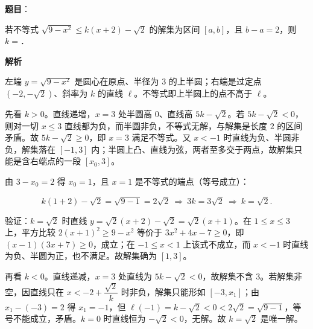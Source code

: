 \begin{answer}

\textbf{题目}：

若不等式 $\sqrt{9-x^2}\leqslant k(x+2)-\sqrt2$ 的解集为区间 $[a,b]$，且 $b-a=2$，则 $k=$\gkblank{}．

\textbf{解析}

左端 $y=\sqrt{9-x^2}$ 是圆心在原点、半径为 $3$ 的上半圆；右端是过定点 $(-2,-\sqrt2)$、斜率为 $k$ 的直线 $\ell$。不等式即上半圆上的点不高于 $\ell$。

先看 $k>0$。直线递增，$x=3$ 处半圆高 $0$、直线高 $5k-\sqrt2$。若 $5k-\sqrt2<0$，则对一切 $x\leqslant3$ 直线都为负，而半圆非负，不等式无解，与解集是长度 $2$ 的区间矛盾。故 $5k-\sqrt2\geqslant0$，即 $x=3$ 满足不等式。又 $x<-1$ 时直线为负、半圆非负，解集落在 $[-1,3]$ 内；半圆上凸、直线为弦，两者至多交于两点，故解集只能是含右端点的一段 $[x_0,3]$。

由 $3-x_0=2$ 得 $x_0=1$，且 $x=1$ 是不等式的端点（等号成立）：

\nopagebreak[4]
\[k(1+2)-\sqrt2=\sqrt{9-1}=2\sqrt2\ \Longrightarrow\ 3k=3\sqrt2\ \Longrightarrow\ k=\sqrt2.\]

验证：$k=\sqrt2$ 时直线 $y=\sqrt2(x+2)-\sqrt2=\sqrt2(x+1)$。在 $1\leqslant x\leqslant3$ 上，平方比较 $2(x+1)^2\geqslant9-x^2$ 等价于 $3x^2+4x-7\geqslant0$，即 $(x-1)(3x+7)\geqslant0$，成立；在 $-1\leqslant x<1$ 上该式不成立，而 $x<-1$ 时直线为负、半圆为正，也不满足。故解集确为 $[1,3]$。

再看 $k<0$。直线递减，$x=3$ 处直线为 $5k-\sqrt2<0$，故解集不含 $3$。若解集非空，因直线只在 $x<-2+\dfrac{\sqrt2}{k}$ 时非负，解集只能形如 $[-3,x_1]$；由 $x_1-(-3)=2$ 得 $x_1=-1$，但 $\ell(-1)=k-\sqrt2<0<2\sqrt2=\sqrt{9-1}$，等号不能成立，矛盾。$k=0$ 时直线恒为 $-\sqrt2<0$，无解。故 $k=\sqrt2$ 是唯一解。


\end{answer}
